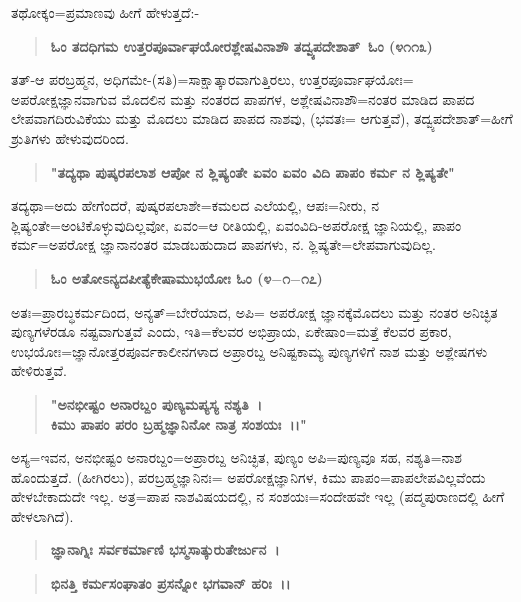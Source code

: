 ತಥೋಕ್ಕಂ=ಪ್ರಮಾಣವು ಹೀಗೆ ಹೇಳುತ್ತದೆ:-

\begin{verse}
\textbf{ಓಂ ತದಧಿಗಮ ಉತ್ತರಪೂರ್ವಾಘಯೋರಶ್ಲೇಷವಿನಾಶೌ‌ ತದ್ವ್ಯಪದೇಶಾತ್~ಓಂ (೪\enginline{-}೧\enginline{-}೧೩)}
\end{verse}

ತತ್-ಆ ಪರಬ್ರಹ್ಮನ, ಅಧಿಗಮೇ-(ಸತಿ)=ಸಾಕ್ಷಾತ್ಕಾರವಾಗುತ್ತಿರಲು, ಉತ್ತರಪೂರ್ವಾ\-ಘಯೋಃ= ಅಪರೋಕ್ಷಜ್ಞಾನವಾಗುವ ಮೊದಲಿನ ಮತ್ತು ನಂತರದ ಪಾಪಗಳ, ಅಶ್ಲೇಷ\-ವಿನಾಶೌ=ನಂತರ ಮಾಡಿದ ಪಾಪದ ಲೇಪವಾಗದಿರುವಿಕೆಯು ಮತ್ತು ಮೊದಲು ಮಾಡಿದ ಪಾಪದ ನಾಶವು, (ಭವತಃ= ಆಗುತ್ತವೆ), ತದ್ವ್ಯಪದೇಶಾತ್=ಹೀಗೆ ಶ್ರುತಿಗಳು ಹೇಳುವುದರಿಂದ.

\begin{verse}
\textbf{"ತದ್ಯಥಾ ಪುಷ್ಕರಪಲಾಶ ಆಪೋ ನ ಶ್ಲಿಷ್ಯಂತೇ ಏವಂ ಏವಂ ವಿದಿ ಪಾಪಂ ಕರ್ಮ ನ ಶ್ಲಿಷ್ಯತೇ"}
\end{verse}

ತದ್ಯಥಾ=ಅದು ಹೇಗೆಂದರೆ, ಪುಷ್ಕರಪಲಾಶೇ=ಕಮಲದ ಎಲೆಯಲ್ಲಿ, ಆಪಃ=ನೀರು, ನ ಶ್ಲಿಷ್ಯಂತೇ=ಅಂಟಿಕೊಳ್ಳುವುದಿಲ್ಲವೋ, ಏವಂ=ಆ ರೀತಿಯಲ್ಲಿ, ಏವಂವಿದಿ-ಅಪರೋಕ್ಷ ಜ್ಞಾನಿಯಲ್ಲಿ, ಪಾಪಂ ಕರ್ಮ=ಅಪರೋಕ್ಷ ಜ್ಞಾನಾನಂತರ ಮಾಡಬಹುದಾದ ಪಾಪಗಳು, ನ. ಶ್ಲಿಷ್ಯತೇ=ಲೇಪವಾಗುವುದಿಲ್ಲ.

\begin{verse}
\textbf{ಓಂ ಅತೋಽನ್ಯದಪೀತ್ಯೆಕೇಷಾಮುಭಯೋಃ ಓಂ (೪$-$೧$-$೧೭)}
\end{verse}

ಅತಃ=ಪ್ರಾರಬ್ಧಕರ್ಮದಿಂದ, ಅನ್ಯತ್=ಬೇರೆಯಾದ, ಅಪಿ= ಅಪರೋಕ್ಷ ಜ್ಞಾನಕ್ಕೆ\break ಮೊದಲು ಮತ್ತು ನಂತರ ಅನಿಚ್ಛಿತ ಪುಣ್ಯಗಳೆರಡೂ ನಷ್ಟವಾಗುತ್ತವೆ ಎಂದು, ಇತಿ=ಕೆಲವರ ಅಭಿಪ್ರಾಯ, ಏಕೇಷಾಂ=ಮತ್ತೆ ಕೆಲವರ ಪ್ರಕಾರ, ಉಭಯೋಃ=ಜ್ಞಾನೋತ್ತರಪೂರ್ವಕಾಲೀನ\-ಗಳಾದ ಅಪ್ರಾರಬ್ದ ಅನಿಷ್ಟಕಾಮ್ಯ ಪುಣ್ಯಗಳಿಗೆ ನಾಶ ಮತ್ತು ಅಶ್ಲೇಷಗಳು ಹೇಳಿರುತ್ತವೆ.

\begin{verse}
\textbf{"ಅನಭೀಷ್ಟಂ ಅನಾರಬ್ದಂ ಪುಣ್ಯಮಪ್ಯಸ್ಯ ನಶ್ಯತಿ~।}\\\textbf{ಕಿಮು ಪಾಪಂ ಪರಂ ಬ್ರಹ್ಮಜ್ಞಾನಿನೋ ನಾತ್ರ ಸಂಶಯಃ~।।"}
\end{verse}


ಅಸ್ಯ=ಇವನ, ಅನಭೀಷ್ಟಂ ಅನಾರಬ್ದಂ=ಅಪ್ರಾರಬ್ದ ಅನಿಚ್ಛಿತ, ಪುಣ್ಯಂ ಅಪಿ=ಪುಣ್ಯವೂ ಸಹ, ನಶ್ಯತಿ=ನಾಶ ಹೊಂದುತ್ತದೆ. (ಹೀಗಿರಲು), ಪರಬ್ರಹ್ಮಜ್ಞಾನಿನಃ= ಅಪರೋಕ್ಷಜ್ಞಾನಿಗಳ, ಕಿಮು ಪಾಪಂ=ಪಾಪಲೇಪವಿಲ್ಲವೆಂದು ಹೇಳಬೇಕಾದುದೇ ಇಲ್ಲ. ಅತ್ರ=ಪಾಪ ನಾಶವಿಷಯದಲ್ಲಿ, ನ ಸಂಶಯಃ=ಸಂದೇಹವೇ ಇಲ್ಲ (ಪದ್ಮಪುರಾಣದಲ್ಲಿ ಹೀಗೆ ಹೇಳಲಾಗಿದೆ).

\begin{verse}
\textbf{ಜ್ಞಾನಾಗ್ನಿಃ ಸರ್ವಕರ್ಮಾಣಿ ಭಸ್ಮಸಾತ್ಕುರುತೇರ್ಜುನ~।}
\end{verse}


\begin{verse}
\textbf{ಭಿನತ್ತಿ ಕರ್ಮಸಂಘಾತಂ ಪ್ರಸನ್ನೋ ಭಗವಾನ್ ಹರಿಃ~।।}
\end{verse}

